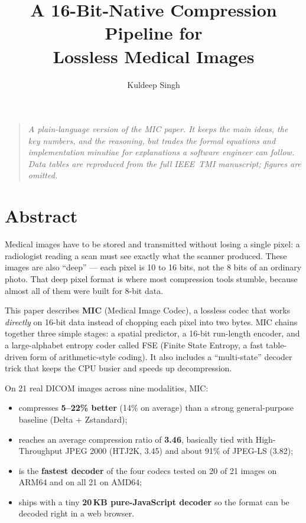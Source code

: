 \documentclass[11pt]{article}
\title{A 16-Bit-Native Compression Pipeline for\\
       Lossless Medical Images}
\author{Kuldeep Singh}
\date{}
\begin{document}
\maketitle

\begin{quote}
\emph{A plain-language version of the MIC paper. It keeps the main ideas, the
key numbers, and the reasoning, but trades the formal equations and
implementation minutiae for explanations a software engineer can follow.
Data tables are reproduced from the full IEEE~TMI manuscript; figures are
omitted.}
\end{quote}

\section*{Abstract}

Medical images have to be stored and transmitted without losing a single
pixel: a radiologist reading a scan must see exactly what the scanner
produced. These images are also ``deep'' --- each pixel is 10 to 16 bits,
not the 8 bits of an ordinary photo. That deep pixel format is where most
compression tools stumble, because almost all of them were built for
8-bit data.

This paper describes \textbf{MIC} (Medical Image Codec), a lossless codec that
works \emph{directly} on 16-bit data instead of chopping each pixel into two
bytes. MIC chains together three simple stages: a spatial predictor, a
16-bit run-length encoder, and a large-alphabet entropy coder called FSE
(Finite State Entropy, a fast table-driven form of arithmetic-style
coding). It also includes a ``multi-state'' decoder trick that keeps the CPU
busier and speeds up decompression.

On 21 real DICOM images across nine modalities, MIC:

\begin{itemize}
  \item compresses \textbf{5--22\% better} (14\% on average) than a strong
  general-purpose baseline (Delta + Zstandard);
  \item reaches an average compression ratio of \textbf{3.46}, basically tied
  with High-Throughput JPEG 2000 (HTJ2K, 3.45) and about 91\% of JPEG-LS
  (3.82);
  \item is the \textbf{fastest decoder} of the four codecs tested on 20 of 21
  images on ARM64 and on all 21 on AMD64;
  \item ships with a tiny \textbf{20\,KB pure-JavaScript decoder} so the format
  can be decoded right in a web browser.
\end{itemize}
\end{document}

